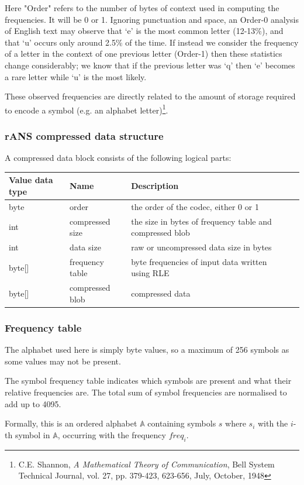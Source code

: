 \documentclass[a4paper]{article}
\begin{document}
Here "Order" refers to the number of bytes of context used in
computing the frequencies. It will be 0 or 1.  Ignoring punctuation
and space, an Order-0 analysis of English text may observe that `e' is
the most common letter (12-13\%), and that `u' occurs only around 2.5\%
of the time.  If instead we consider the frequency of a letter in the
context of one previous letter (Order-1) then these statistics change
considerably;  we know that if the previous letter was `q' then `e'
becomes a rare letter while `u' is the most likely.

These observed frequencies are directly related to the amount of
storage required to encode a symbol (e.g. an alphabet
letter)\footnote{ C.E. Shannon, \textit{A Mathematical Theory of
    Communication}, Bell System Technical Journal, vol. 27,
    pp. 379-423, 623-656, July, October, 1948}.


\subsubsection{\textbf{rANS compressed data structure}}
A compressed data block consists of the following logical parts: 


\begin{tabular}{|l|l|>{\raggedright}p{100pt}|>{\raggedright}p{220pt}|}
\hline
\textbf{Value data type} & \textbf{Name} & \textbf{Description}\tabularnewline
\hline
byte & order & the order of the codec, either 0 or 1\tabularnewline
\hline
int & compressed size & the size in bytes of frequency table and compressed blob\tabularnewline
\hline
int & data size & raw or uncompressed data size in bytes\tabularnewline
\hline
byte[] & frequency table & byte frequencies of input data written using RLE\tabularnewline
\hline
byte[] & compressed blob & compressed data\tabularnewline
\hline
\end{tabular}

\subsubsection{\textbf{Frequency table}}

The alphabet used here is simply byte values, so a maximum of 256
symbols as some values may not be present.

The symbol frequency table indicates which symbols are present and
what their relative frequencies are.  The total sum of symbol
frequencies are normalised to add up to 4095.

Formally, this is an ordered alphabet $\mathbb{A}$ containing symbols $s$ where
$s_{i}$ with the $i$-th symbol in $\mathbb{A}$, occurring with the frequency $freq_{i}$.
\end{document}
